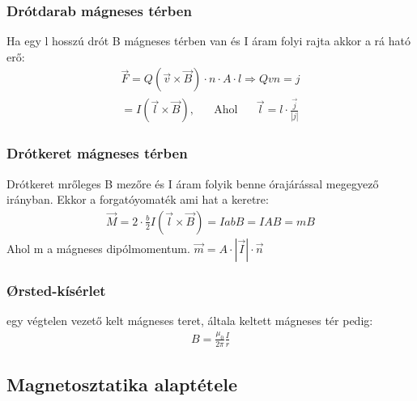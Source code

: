 \documentclass{article}
\begin{document}
\subsubsection{Drótdarab mágneses térben}
Ha egy l hosszú drót B mágneses térben van és I áram folyi rajta akkor a rá ható erő: 
\begin{gather*}
\vec{F} = Q (\vec{v} \times \vec{B}) \cdot n \cdot A \cdot l \Rightarrow Qvn=j \\
=I(\vec{l} \times \vec{B}), \hspace{20pt} \mathrm{Ahol} \hspace{20pt} \vec{l}= l\cdot \frac{\vec{j}}{|j|}
\end{gather*}
\subsubsection{Drótkeret mágneses térben}
Drótkeret mrőleges B mezőre és I áram folyik benne órajárással megegyező irányban. Ekkor a forgatóyomaték ami hat a keretre:
\begin{gather*}
\vec{M} = 2\cdot \frac{b}{2} I(\vec{l} \times \vec{B}) = IabB = IAB = mB
\end{gather*}
Ahol m a mágneses dipólmomentum. $\vec{m} =  A \cdot |\vec{I}| \cdot \vec{n}$
\subsubsection{Ørsted-kísérlet}
egy végtelen vezető kelt mágneses teret, általa keltett mágneses tér pedig:
\begin{gather*}
B=\frac{\mu_0}{2\pi} \frac{I}{r}
\end{gather*}
\subsection{Magnetosztatika alaptétele}
\end{document}
